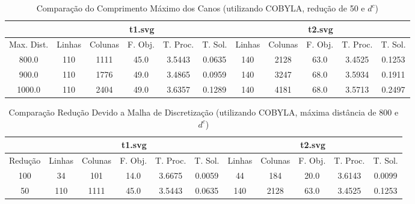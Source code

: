 \begin{landscape}
\begin{table}
    \centering
    \caption{Comparação do Comprimento Máximo dos Canos (utilizando COBYLA,
    redução de 50 e $d^c$)}
    \label{tab:maxd}
    \begin{tabular}{|c|c|c|c|c|c|c|c|c|c|c|}
        \hline
        & \multicolumn{5}{|c|}{t1.svg} & \multicolumn{5}{|c|}{t2.svg} \\ \hline
        Max. Dist. & Linhas & Colunas & F. Obj. & T. Proc. & T. Sol. & Linhas &
        Colunas & F. Obj. & T. Proc. & T. Sol. \\ \hline
        800.0 & 110 & 1111 & 45.0 & 3.5443 & 0.0635 & 140 & 2128 & 63.0 & 3.4525 & 0.1253 \\ \hline
        900.0 & 110 & 1776 & 49.0 & 3.4865 & 0.0959 & 140 & 3247 & 68.0 & 3.5934 & 0.1911 \\ \hline
        1000.0 & 110 & 2404 & 49.0 & 3.6357 & 0.1289 & 140 & 4181 & 68.0 & 3.5713 & 0.2497 \\ \hline
    \end{tabular}
\end{table}

\begin{table}
    \centering
    \caption{Comparação Redução Devido a Malha de Discretização (utilizando COBYLA, máxima
    distância de 800 e $d^c$)}
    \label{tab:reduce}
    \begin{tabular}{|c|c|c|c|c|c|c|c|c|c|c|}
        \hline
        & \multicolumn{5}{|c|}{t1.svg} & \multicolumn{5}{|c|}{t2.svg} \\ \hline
        Redução & Linhas & Colunas & F. Obj. & T. Proc. & T. Sol. & Linhas &
        Colunas & F. Obj. & T. Proc. & T. Sol. \\ \hline
        100 & 34 & 101 & 14.0 & 3.6675 & 0.0059 & 44 & 184 & 20.0 & 3.6143 & 0.0099 \\ \hline
        50 & 110 & 1111 & 45.0 & 3.5443 & 0.0635 & 140 & 2128 & 63.0 & 3.4525 & 0.1253 \\ \hline
    \end{tabular}
\end{table}
\end{landscape}
